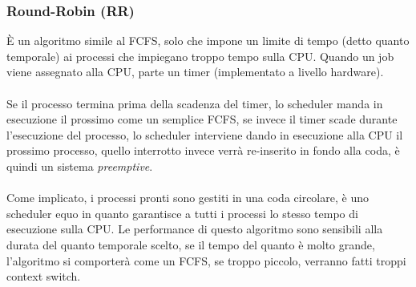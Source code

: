 \documentclass[12pt, letterpaper]{article}
\newcommand{\acc}{\\\hphantom{}\\}
\begin{document}
\subsubsection{Round-Robin (RR)}
È un algoritmo simile al FCFS, solo che impone un limite di tempo 
(detto quanto temporale) ai processi che impiegano troppo tempo 
sulla CPU. Quando un job viene assegnato alla CPU, parte un timer 
(implementato a livello hardware). \acc Se il processo termina prima della scadenza 
del timer, lo scheduler manda in esecuzione il prossimo come un semplice 
FCFS, se invece il timer scade durante l'esecuzione del processo, 
lo scheduler interviene dando in esecuzione alla CPU il prossimo processo, quello 
interrotto invece verrà re-inserito in fondo alla coda, è quindi un sistema 
\textit{preemptive}.\acc Come implicato, i processi pronti sono gestiti 
in una coda circolare, è uno scheduler equo in quanto garantisce a tutti 
i processi lo stesso tempo di esecuzione sulla CPU. Le performance di questo 
algoritmo sono sensibili alla durata del quanto temporale scelto, se il tempo 
del quanto è molto grande, l'algoritmo si comporterà come un FCFS, 
se troppo piccolo, verranno fatti troppi context switch.
\end{document}
